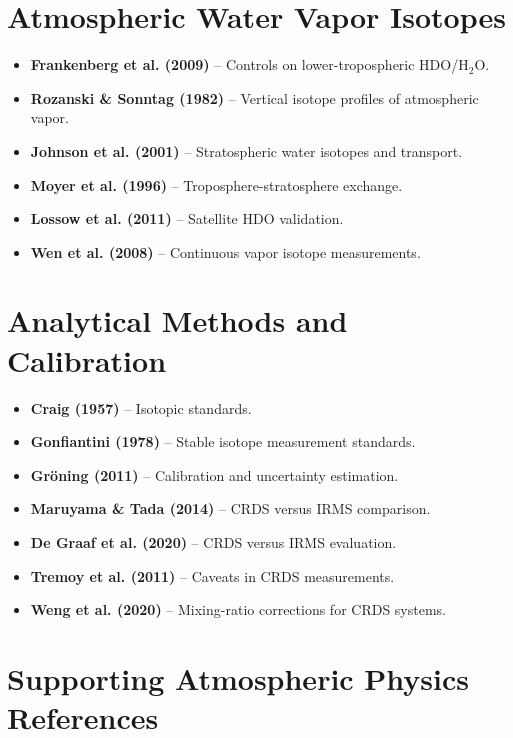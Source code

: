 \documentclass[11pt,a4paper]{article}
\begin{document}
\section{Atmospheric Water Vapor Isotopes}


\begin{itemize}
    \item \textbf{Frankenberg et al. (2009)} -- Controls on lower-tropospheric HDO/H$_2$O.
    \item \textbf{Rozanski \& Sonntag (1982)} -- Vertical isotope profiles of atmospheric vapor.
    \item \textbf{Johnson et al. (2001)} -- Stratospheric water isotopes and transport.
    \item \textbf{Moyer et al. (1996)} -- Troposphere-stratosphere exchange.
    \item \textbf{Lossow et al. (2011)} -- Satellite HDO validation.
    \item \textbf{Wen et al. (2008)} -- Continuous vapor isotope measurements.
\end{itemize}

\section{Analytical Methods and Calibration}


\begin{itemize}
    \item \textbf{Craig (1957)} -- Isotopic standards.
    \item \textbf{Gonfiantini (1978)} -- Stable isotope measurement standards.
    \item \textbf{Gröning (2011)} -- Calibration and uncertainty estimation.
    \item \textbf{Maruyama \& Tada (2014)} -- CRDS versus IRMS comparison.
    \item \textbf{De Graaf et al. (2020)} -- CRDS versus IRMS evaluation.
    \item \textbf{Tremoy et al. (2011)} -- Caveats in CRDS measurements.
    \item \textbf{Weng et al. (2020)} -- Mixing-ratio corrections for CRDS systems.
\end{itemize}

\section{Supporting Atmospheric Physics References}
\end{document}
